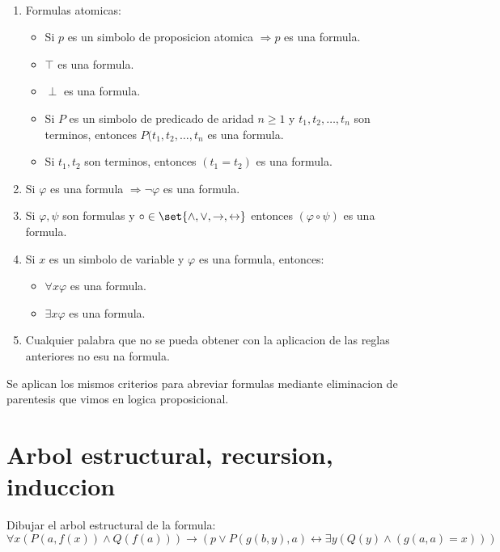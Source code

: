 \begin{definition}
	~\begin{enumerate}
		\item Formulas atomicas: \begin{itemize}
			      \item Si \(p \) es un simbolo de proposicion atomica \(\Rightarrow p \) es una formula.
			      \item \(\top \) es una formula.
			      \item \(\perp \) es una formula.
			      \item Si \(P \) es un simbolo de predicado de aridad \(n \geq 1\) y \(t_1,t_2,\ldots,t_n \) son terminos, entonces \(P(t_1,t_2,\ldots,t_n \) es una formula.
			      \item Si \(t_1,t_2 \) son terminos, entonces \((t_1 = t_2 )\) es una formula.
		      \end{itemize}
		\item Si \(\varphi\) es una formula \(\Rightarrow \neg \varphi\) es una formula.
		\item Si \(\varphi,\psi \) son formulas y \(\circ \in \set{\wedge,\vee,\rightarrow,\leftrightarrow }\) entonces \((\varphi \circ \psi )\) es una formula.
		\item Si \(x \) es un simbolo de variable y \(\varphi\) es una formula, entonces:
		      \begin{itemize}
			      \item \(\forall x \varphi\) es una formula.
			      \item \(\exists x \varphi\) es una formula.
		      \end{itemize}
		\item Cualquier palabra que no se pueda obtener con la aplicacion de las reglas anteriores no esu na formula.
	\end{enumerate}
\end{definition}

\begin{remark}
	Se aplican los mismos criterios para abreviar formulas mediante eliminacion de parentesis que vimos en logica proposicional.
\end{remark}

\section{Arbol estructural, recursion, induccion}

\begin{remark}

\end{remark}
\begin{example}
	Dibujar el arbol estructural de la formula:
	\[
		\forall x (P(a,f(x)) \wedge Q(f(a))) \rightarrow (p \vee P(g(b,y),a) \leftrightarrow \exists y (Q(y) \wedge (g(a,a) = x)))
	\]


\end{example}

